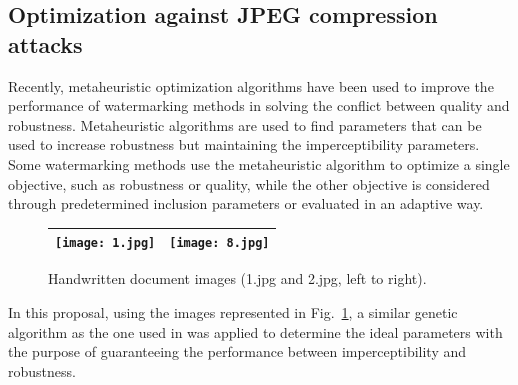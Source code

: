 \documentclass[runningheads]{llncs}
\begin{document}
\subsection*{Optimization against JPEG compression attacks}
Recently, metaheuristic optimization algorithms have been used \cite{Abdelhakim2018,Avila-Domenech1899} to improve the performance of watermarking methods in solving the conflict between quality and robustness. Metaheuristic algorithms are used to find parameters that can be used to increase robustness but maintaining the imperceptibility parameters. Some watermarking methods use the metaheuristic algorithm to optimize a single objective, such as robustness or quality, while the other objective is considered through predetermined inclusion parameters or evaluated in an adaptive way.
\begin{figure}[h]
	\begin{center}
		\begin{tabular}{|c|c|}\hline
			\texttt{[image: 1.jpg]}
			&\texttt{[image: 8.jpg]}\\\hline
		\end{tabular}
	\end{center}
	\caption{Handwritten document images (1.jpg and 2.jpg, left to right).}
	\label{img_of_AHM}
\end{figure}

In this proposal, using the images represented in Fig.~\ref{img_of_AHM}, a similar genetic algorithm as the one used in \cite{Avila-Domenech1899} was applied to determine the ideal parameters with the purpose of guaranteeing the performance between imperceptibility and robustness.
\end{document}
